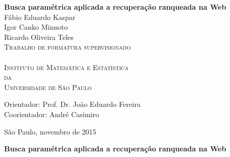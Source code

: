 \documentclass[11pt,oneside,a4paper]{book}
\begin{document}
\frontmatter 
\fancyhead[RO]{{\footnotesize\rightmark}\hspace{2em}\thepage}
\setcounter{tocdepth}{2}
\fancyhead[LE]{\thepage\hspace{2em}\footnotesize{\leftmark}}
\fancyhead[RE,LO]{}
\fancyhead[RO]{{\footnotesize\rightmark}\hspace{2em}\thepage}

\onehalfspacing  %

\thispagestyle{empty}
\begin{center}
    \vspace*{2.3cm}
    \textbf{\Large{Busca paramétrica aplicada a recuperação ranqueada na Web}}\\
    
    \vskip 2cm
    \Large{Fábio Eduardo Kaspar} \\
    \Large{Igor Canko Minnoto} \\
    \Large{Ricardo Oliveira Teles} \\
    
    \vskip 2cm
    \textsc{
    Trabalho de formatura supervisionado\\ \\[-0.25cm] 
    \vskip 0.25cm
    Instituto de Matemática e Estatística\\[-0.25cm]
    da\\[-0.25cm]
    Universidade de São Paulo\\[-0.25cm]}

    \vskip 1.5cm
    Orientador: Prof. Dr. João Eduardo Fereira\\
    Coorientador: André Casimiro

   	\vskip 1cm
    
    \vskip 0.5cm
    \normalsize{São Paulo, novembro de 2015}
\end{center}

%
%
%
\newpage
\thispagestyle{empty}
    \begin{center}
        \vspace*{2.3 cm}
        \textbf{\Large{Busca paramétrica aplicada a recuperação ranqueada na Web}}\\
        \vspace*{2 cm}
    \end{center}
\end{document}
